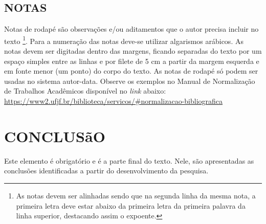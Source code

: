 \documentclass[
  oneside, %
  english,
  brazil
]{abntbibufjf}
\begin{document}
\section{NOTAS} %

Notas de rodapé são observaç\~{o}es e/ou aditamentos que o autor precisa incluir no texto \footnote[2]{As notas devem ser alinhadas sendo que na segunda linha da mesma nota, a primeira letra deve estar abaixo da primeira letra da primeira palavra da linha superior, destacando assim o expoente.}. Para a numeração das notas deve-se utilizar algarismos arábicos. As notas devem ser digitadas dentro das margens, ficando separadas do texto por um espaço simples entre as linhas e por filete de 5 cm a partir da margem esquerda e em fonte menor (um ponto) do corpo do texto. As notas de rodapé só podem ser usadas no sistema autor-data. Observe os exemplos no Manual de Normalização de Trabalhos Acadêmicos disponível no \textit{link} abaixo: \\
\url{https://www2.ufjf.br/biblioteca/servicos/#normalizacao-bibliografica}




\chapter{CONCLUSãO} %

Este elemento é obrigatório e é a parte final do texto.  Nele, são apresentadas as conclusões identificadas a partir do desenvolvimento da pesquisa.


\end{document}

